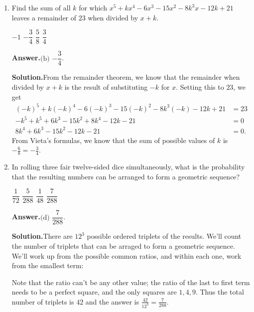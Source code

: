 \documentclass[11pt,paper=letter]{scrartcl}
\newcommand{\ansb}[2]{{\sffamily \bfseries Answer.}\;\(\boxed{\text{(#1) #2}}\).}
\newcommand{\sol}{{\sffamily \bfseries Solution.}\;}
\begin{document}
\begin{enumerate}[align=left,leftmargin=*]
\item Find the sum of all $k$ for which $x^5 + kx^4 - 6x^3 - 15x^2 - 8k^3x - 12k + 21$ leaves a remainder of $23$ when divided by $x + k$.

\fourch
{$-1$}
{$-\dfrac{3}{4}$}
{$\dfrac{5}{8}$}
{$\dfrac{3}{4}$}

\ansb{b}{$-\dfrac{3}{4}$}

\sol From the remainder theorem, we know that the remainder when divided by $x + k$ is the result of substituting $-k$ for $x$. Setting this to $23$, we get
\begin{align*}
(-k)^5 + k(-k)^4 - 6(-k)^3 - 15(-k)^2 - 8k^3(-k) - 12k + 21 &= 23 \\
-k^5 + k^5 + 6k^3 - 15k^2 + 8k^4 - 12k - 21 &= 0 \\
8k^4 + 6k^3 - 15k^2 - 12k - 21 &= 0.
\end{align*}
From Vieta's formulas, we know that the sum of possible values of $k$ is $-\frac{6}{8} = -\frac{3}{4}$.

\item In rolling three fair twelve-sided dice simultaneously, what is the probability that the resulting numbers can be arranged to form a geometric sequence?

\fourch
{$\dfrac{1}{72}$}
{$\dfrac{5}{288}$}
{$\dfrac{1}{48}$}
{$\dfrac{7}{288}$}

\ansb{d}{$\dfrac{7}{288}$}

\sol There are $12^3$ possible ordered triplets of the results. We'll count the number of triplets that can be arraged to form a geometric sequence. We'll work up from the possible common ratios, and within each one, work from the smallest term:
Note that the ratio can't be any other value; the ratio of the last to first term needs to be a perfect square, and the only squares are $1, 4, 9$. Thus the total number of triplets is $42$ and the answer is $\frac{42}{12^3} = \frac{7}{288}$.


\end{enumerate}
\end{document}
